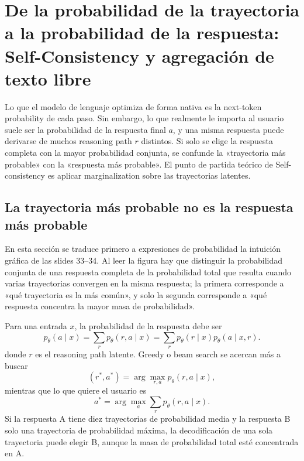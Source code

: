 \section{De la probabilidad de la trayectoria a la probabilidad de la respuesta: Self-Consistency y agregación de texto libre}

Lo que el modelo de lenguaje optimiza de forma nativa es la next-token probability de cada paso. Sin embargo, lo que realmente le importa al usuario suele ser la probabilidad de la respuesta final $a$, y una misma respuesta puede derivarse de muchos reasoning path $r$ distintos. Si solo se elige la respuesta completa con la mayor probabilidad conjunta, se confunde la «trayectoria más probable» con la «respuesta más probable». El punto de partida teórico de Self-consistency es aplicar marginalization sobre las trayectorias latentes.

\subsection{La trayectoria más probable no es la respuesta más probable}

En esta sección se traduce primero a expresiones de probabilidad la intuición gráfica de las slides 33--34. Al leer la figura hay que distinguir la probabilidad conjunta de una respuesta completa de la probabilidad total que resulta cuando varias trayectorias convergen en la misma respuesta; la primera corresponde a «qué trayectoria es la más común», y solo la segunda corresponde a «qué respuesta concentra la mayor masa de probabilidad».

Para una entrada $x$, la probabilidad de la respuesta debe ser
\[
p_\theta(a\mid x)=\sum_{r}p_\theta(r,a\mid x)
=\sum_r p_\theta(r\mid x)p_\theta(a\mid x,r).
\]
donde $r$ es el reasoning path latente. Greedy o beam search se acercan más a buscar
\[
(r^*,a^*)=\arg\max_{r,a}p_\theta(r,a\mid x),
\]
mientras que lo que quiere el usuario es
\[
a^*=\arg\max_a\sum_r p_\theta(r,a\mid x).
\]
Si la respuesta A tiene diez trayectorias de probabilidad media y la respuesta B solo una trayectoria de probabilidad máxima, la decodificación de una sola trayectoria puede elegir B, aunque la masa de probabilidad total esté concentrada en A.



